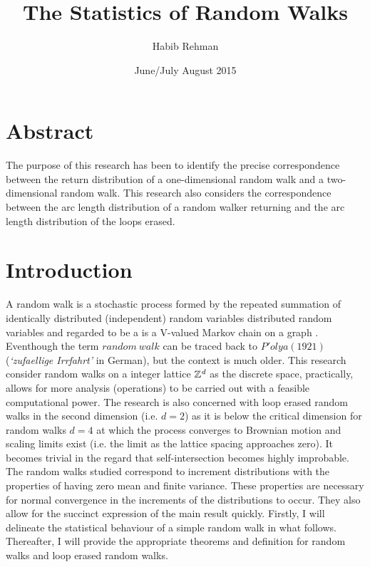 \documentclass{article}
\title{The Statistics of Random Walks}
\author{Habib Rehman}
\date{June/July August 2015}
\begin{document}
\maketitle
 


\section*{Abstract}
The purpose of this research has been to identify the precise correspondence between the return distribution of a one-dimensional random walk and a two-dimensional random walk. This research also considers the correspondence between the arc length distribution of a random walker returning and the arc length distribution of the loops erased.
\tableofcontents
\newpage

\section{Introduction}
	A random walk is a stochastic process formed by the repeated summation of identically distributed (independent) random variables distributed random variables and regarded to be a is a V-valued Markov chain on a graph \cite{schweinsberg2009loop}. Eventhough the term $random\ walk$ can be traced back to $P'olya \left( 1921 \right)$ (\emph{‘zufaellige Irrfahrt’} in German), but the context is much older. This research consider random walks on a integer lattice $\mathbb{Z}^\emph{{d}}$ as the discrete space, practically, allows for more analysis (operations) to be carried out with a feasible computational power. The research is also concerned with loop erased random walks in the second dimension (i.e. $d=2$) as it is below the critical dimension for random walks  $d = 4$ at which the process converges to Brownian motion \cite{lawler2010} and scaling limits exist (i.e. the limit as the lattice spacing approaches zero). It becomes trivial in the regard that self-intersection becomes highly improbable. The random walks studied correspond to increment distributions with the properties of having zero mean and finite variance. These properties are necessary for normal convergence in the increments of the distributions to occur. They also allow for the succinct expression of the main result quickly. Firstly, I will delineate the statistical behaviour of a simple random walk in what follows. Thereafter, I will provide the appropriate theorems and definition for random walks and loop erased random walks.
\end{document}
